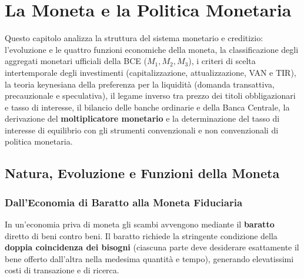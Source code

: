 \chapter{La Moneta e la Politica Monetaria}
\label{chap:moneta_politica_monetaria}

\begin{tcolorbox}[colback=navyblue!5!white, colframe=navyblue, title=\textbf{Quadro Concettuale del Capitolo}]
Questo capitolo analizza la struttura del sistema monetario e creditizio: l'evoluzione e le quattro funzioni economiche della moneta, la classificazione degli aggregati monetari ufficiali della BCE ($M_1, M_2, M_3$), i criteri di scelta intertemporale degli investimenti (capitalizzazione, attualizzazione, VAN e TIR), la teoria keynesiana della preferenza per la liquidità (domanda transattiva, precauzionale e speculativa), il legame inverso tra prezzo dei titoli obbligazionari e tasso di interesse, il bilancio delle banche ordinarie e della Banca Centrale, la derivazione del \textbf{moltiplicatore monetario} e la determinazione del tasso di interesse di equilibrio con gli strumenti convenzionali e non convenzionali di politica monetaria.
\end{tcolorbox}

\section{Natura, Evoluzione e Funzioni della Moneta}

\subsection{Dall'Economia di Baratto alla Moneta Fiduciaria}
In un'economia priva di moneta gli scambi avvengono mediante il \textbf{baratto} diretto di beni contro beni. Il baratto richiede la stringente condizione della \textbf{doppia coincidenza dei bisogni} (ciascuna parte deve desiderare esattamente il bene offerto dall'altra nella medesima quantità e tempo), generando elevatissimi costi di transazione e di ricerca.


